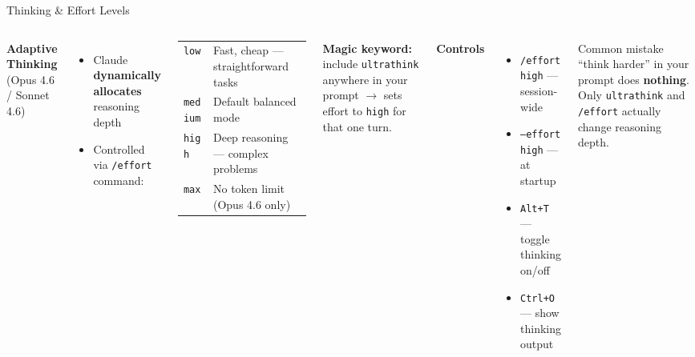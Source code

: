 \documentclass[aspectratio=169]{beamer}
\begin{document}
\begin{frame}{Thinking \& Effort Levels}
\begin{columns}[T]
\textbf{\color{popblue}Adaptive Thinking} (Opus 4.6 / Sonnet 4.6)
\begin{itemize}
  \item Claude \textbf{dynamically allocates} reasoning depth
  \item Controlled via \texttt{/effort} command:
\end{itemize}

\smallskip
{\small
\begin{tabular}{ll}
\texttt{low} & Fast, cheap --- straightforward tasks \\
\texttt{medium} & Default balanced mode \\
\texttt{high} & Deep reasoning --- complex problems \\
\texttt{max} & No token limit (Opus 4.6 only) \\
\end{tabular}}

\bigskip
\textbf{\color{warnred}Magic keyword:} include \texttt{ultrathink} anywhere in your prompt $\to$ sets effort to \texttt{high} for that one turn.

\textbf{\color{paramgreen}Controls}
\begin{itemize}
  \item \texttt{/effort high} --- session-wide
  \item \texttt{--effort high} --- at startup
  \item \texttt{Alt+T} --- toggle thinking on/off
  \item \texttt{Ctrl+O} --- show thinking output
\end{itemize}

\bigskip
\begin{alertblock}{Common mistake}
``think harder'' in your prompt does \textbf{nothing}. Only \texttt{ultrathink} and \texttt{/effort} actually change reasoning depth.
\end{alertblock}
\end{columns}
\end{frame}
\end{document}

